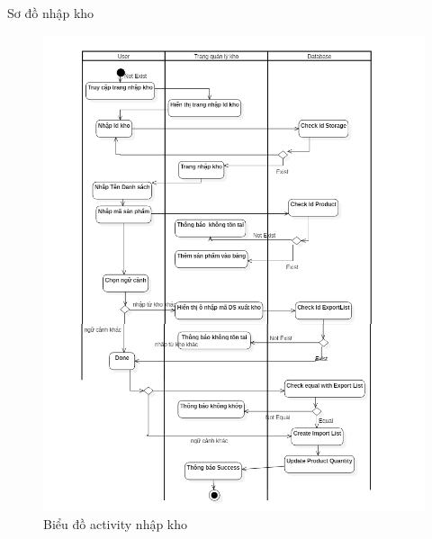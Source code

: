 \documentclass{beamer}
\begin{document}
\begin{frame}{Sơ đồ nhập kho}
    \begin{figure}
        \centering
        \includegraphics[scale  = 0.2]{35.png}
        \caption{Biểu đồ activity nhập kho}
    \end{figure}
\end{frame}
\end{document}
